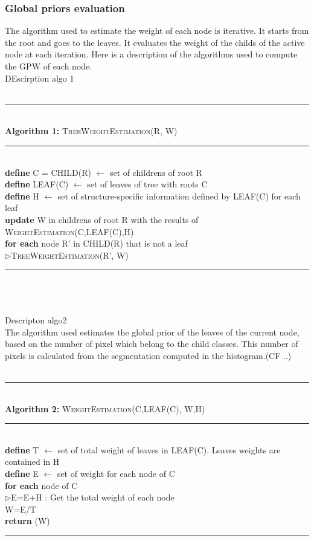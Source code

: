 \subsubsection{Global priors evaluation}
The algorithm used to estimate the weight of each node is iterative. It starts from the root and goes to the leaves. It evaluates the weight of the childs of the active node at each iteration. Here is a description of the algorithms used to compute the GPW of each node.\\
DEscirption algo 1\\\\
%
%
\begin{minipage}{1\textwidth}
%
\hrule
\textbf{\\Algorithm 1:} \textsc{TreeWeightEstimation}(R, W)
\hrule
\textbf{\\define}  C = CHILD(R) $\leftarrow$ set of childrens of root R\\ 
\textbf{define}  LEAF(C)      $\leftarrow$ set of leaves of tree with roots C\\ 
\textbf{define}  H            $\leftarrow$ set of structure-specific information defined by LEAF(C) for each leaf\\
%
\textbf{update} W in childrens of root R with the results of \textsc{WeightEstimation}(C,LEAF(C),H)\\
%
\textbf{for each} node R' in CHILD(R) that is not a leaf\\
%
$\triangleright$\textsc{TreeWeightEstimation}(R', W)\\
\hrule
%
\end{minipage}
%
\\\\\\Descripton algo2\\
The algorithm used estimates the global prior of the leaves of the current node, based on the number of pixel which belong to the child classes.
This number of pixels is calculated from the segmentation computed in the histogram.(CF ..)\\\\
%
\begin{minipage}{1\textwidth}
%
\hrule
\textbf{\\Algorithm 2:} \textsc{WeightEstimation}(C,LEAF(C), W,H)
\hrule
\textbf{\\define}  T $\leftarrow$ set of total weight of leaves in LEAF(C). Leaves weights are contained in H\\ 
\textbf{define}  E      $\leftarrow$ set of weight for each node of C\\ 
\textbf{for each}  node of C\\
$\triangleright$E=E+H : Get the total weight of each node\\
%
W=E/T\\
%
\textbf{return} (W)\\
\hrule
%
\end{minipage}
%

